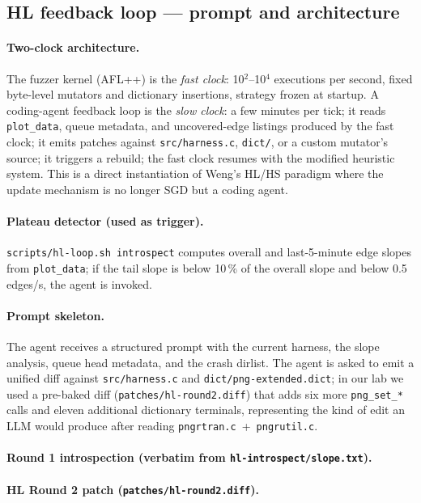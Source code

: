 \documentclass[letterpaper,twocolumn,10pt]{article}
\begin{document}
\subsection{HL feedback loop --- prompt and architecture}
\label{app:hl}

\paragraph{Two-clock architecture.}
The fuzzer kernel (AFL++) is the \emph{fast clock}: 10$^2$--10$^4$
executions per second, fixed byte-level mutators and dictionary insertions,
strategy frozen at startup. A coding-agent feedback loop is the
\emph{slow clock}: a few minutes per tick; it reads
\texttt{plot\_data}, queue metadata, and uncovered-edge listings produced by
the fast clock; it emits patches against \texttt{src/harness.c},
\texttt{dict/}, or a custom mutator's source; it triggers a rebuild; the
fast clock resumes with the modified heuristic system. This is a direct
instantiation of Weng's HL/HS paradigm where the
update mechanism is no longer SGD but a coding agent.

\paragraph{Plateau detector (used as trigger).}
\texttt{scripts/hl-loop.sh introspect} computes overall and last-5-minute
edge slopes from \texttt{plot\_data}; if the tail slope is below 10\,\% of
the overall slope and below 0.5\,edges/s, the agent is invoked.

\paragraph{Prompt skeleton.}
The agent receives a structured prompt with the current harness, the slope
analysis, queue head metadata, and the crash dirlist. The agent is asked
to emit a unified diff against \texttt{src/harness.c} and
\texttt{dict/png-extended.dict}; in our lab we used a pre-baked diff
(\texttt{patches/hl-round2.diff}) that adds six more \texttt{png\_set\_*}
calls and eleven additional dictionary terminals, representing the kind of
edit an LLM would produce after reading
\texttt{pngrtran.c}~+~\texttt{pngrutil.c}.

\paragraph{Round 1 introspection (verbatim from \texttt{hl-introspect/slope.txt}).}


\paragraph{HL Round 2 patch (\texttt{patches/hl-round2.diff}).}

\end{document}
